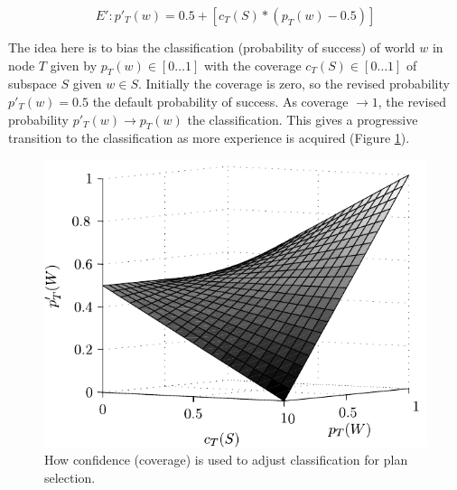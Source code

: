 \begin{equation}
\label{eqn:coverage}   
E': p'_T(w)= 0.5 + \left[  c_T(S) *  \left( p_T(w) - 0.5 \right)  \right]
\end{equation}

The idea here is to bias the \dt classification (probability
of success) of world $w$ in node $T$ given by $p_T(w) \in [0 \ldots
1]$ with the coverage $c_T(S) \in [0 \ldots 1]$ of subspace $S$ given
$w \in S$. Initially the coverage is zero, so the revised probability
$p'_T(w) = 0.5$ the default probability of success. As coverage
$\rightarrow 1$, the revised probability $p'_T(w) \rightarrow p_T(w)$
the \dt classification. This gives a progressive transition to the \dt
classification as more experience is acquired (Figure
\ref{fig:coverage-surface}). 

\begin{figure}[ht]
   \centering
   \includegraphics[width=\columnwidth]{figs/coverage-surface}
   \caption{How confidence (coverage) is used to adjust \dt classification for plan selection.}
   \label{fig:coverage-surface}
\end{figure}


